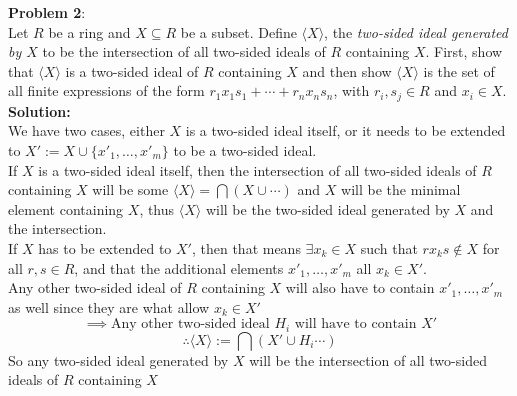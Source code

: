 \documentclass[11pt]{article}
\newcommand{\prob}[3]{\begin{flushleft}
        \textbf{Problem #1}: \\
        #2 
		\textbf{Solution:} 
		#3

\end{flushleft}}
\begin{document}
\prob{2}{
    Let $R$ be a ring and $X \subseteq R$ be a subset. Define $\langle X \rangle$, the \emph{two-sided ideal generated by $X$} to be the intersection of all two-sided ideals of $R$ containing $X$. First, show that $\langle X \rangle$ is a two-sided ideal of $R$ containing $X$ and then show $\langle X \rangle$ is the set of all finite expressions of the form $r_1x_1s_1 + \cdots + r_nx_ns_n$, with $r_i,s_j \in R$ and $x_i \in X$. \\
}{ \\
    We have two cases, either $X$ is a two-sided ideal itself, or it needs to be extended to $X' := X \cup \{ x'_1, \ldots, x'_m \}$ to be a two-sided ideal. \\
    If $X$ is a two-sided ideal itself, then the intersection of all two-sided ideals of $R$ containing $X$ will be some $\langle X \rangle = \bigcap (X \cup \cdots)$ and $X$ will be the minimal element containing $X$, thus $\langle X \rangle$ will be the two-sided ideal generated by $X$ and the intersection. \\
    If $X$ has to be extended to $X'$, then that means $\exists x_k \in X$ such that $rx_ks \notin X$ for all $r, s \in R$, and that the additional elements $x'_1, \ldots, x'_m$ all $x_k \in X'$. \\
    Any other two-sided ideal of $R$ containing $X$ will also have to contain $x'_1, \ldots, x'_m$ as well since they are what allow $x_k \in X'$
    $$\implies \text{Any other two-sided ideal $H_i$ will have to contain $X'$}$$
    $$\therefore \langle X \rangle := \bigcap (X' \cup H_i \cdots)$$
    So any two-sided ideal generated by $X$ will be the intersection of all two-sided ideals of $R$ containing $X$
}
\end{document}
